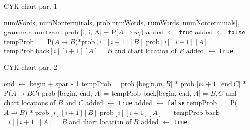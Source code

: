 \documentclass[11pt,twocolumn]{article}
\begin{document}



\nocite{*}

\begin{algorithm*}[!htb]
\caption{CYK chart part 1}
\label{cyk1}
\begin{algorithmic}[1]
\Require numWords, numNonterminals, prob[numWords, numWords, numNonterminals], grammar, nonterms
             \State prob [i, i, A] = P($A \rightarrow w_i$)
             \EndIf
		\State added $\gets$ \texttt{true}
			\State added $\gets$ \texttt{false}
					\State tempProb $=$ P($A \rightarrow B$)*prob$[i][i+1][B]$
						\State prob$[i][i+1][A] =$ tempProb
						\State back$[i][i+1] [A] = B$ and chart location of $B$
						\State added $\gets$ \texttt{true}
					\EndIf
				\EndIf
			\EndFor
		\EndWhile
\EndFor
\EndFor
\EndProcedure
{}
\end{algorithmic}
\end{algorithm*}

\begin{algorithm*}[!htb]
\caption{CYK chart part 2}
\label{cyk2}
\begin{algorithmic}[1]
             \State end $\gets$ begin + span - 1
                            \State tempProb = prob [begin,$ m, B]$ * prob $[m + 1,$ end,$ C]$ * P($A \rightarrow BC$) 
                              \State  prob [begin, end, $A$] = tempProb
                              \State  back[begin, end, $A$] = $B, C$ and chart locations of $B$ and $C$
                              \EndIf
				 \State added $\gets$ \texttt{true}
			\State added $\gets$ \texttt{false}
					\State tempProb $=$ P($A \rightarrow B$) * prob$[i][i+1][B]$
						\State prob$[i][i+1][A] =$ tempProb
						\State back$[i][i+1] [A] = B$ and chart location of $B$
						\State added $\gets$ \texttt{true}
					\EndIf
				\EndIf
			\EndFor
		\EndWhile
\EndFor
\EndFor
\EndFor
\EndFor
\EndFor
\EndFor
\EndProcedure
\end{algorithmic}
\end{algorithm*}
\end{document}
